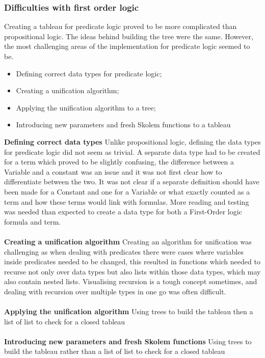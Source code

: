\documentclass{article}%
\begin{document}
\subsubsection{Difficulties with first order logic}
Creating a tableau for predicate logic proved to be more complicated than propositional logic. The ideas behind building the tree were the same. However, the most challenging areas of the implementation for predicate logic seemed to be. 
\begin{itemize}
\item Defining correct data types for predicate logic;
\item Creating a unification algorithm;
\item Applying the unification algorithm to a tree;
\item Introducing new parameters and fresh Skolem functions to a tableau 
\end{itemize}
\textbf{Defining correct data types} 
Unlike propositional logic, defining the data types for predicate logic did not seem as trivial. A separate data type had to be created for a term which proved to be slightly confusing, the difference between a Variable and a constant was an issue and it was not first clear how to differentiate between the two. It was not clear if a separate definition should have been made for a Constant and one for a Variable or what exactly counted as a term and how these terms would link with formulas. More reading and testing was needed than expected to create a data type for both a First-Order logic formula and term. \\\\
\textbf{Creating a unification algorithm} Creating an algorithm for unification was challenging as when dealing with predicates there were cases where variables inside predicates needed to be changed, this resulted in functions which needed to recurse not only over data types but also lists within those data types, which may also contain nested lists. Visualising recursion is a tough concept sometimes, and dealing with recursion over multiple types in one go was often difficult.
\\\\
\textbf{Applying the unification algorithm}
Using trees to build the tableau then a list of list to check for a closed tableau \\\\
\textbf{Introducing new parameters and fresh Skolem functions}
Using trees to build the tableau rather than a list of list to check for a closed tableau \\\\
\end{document}
